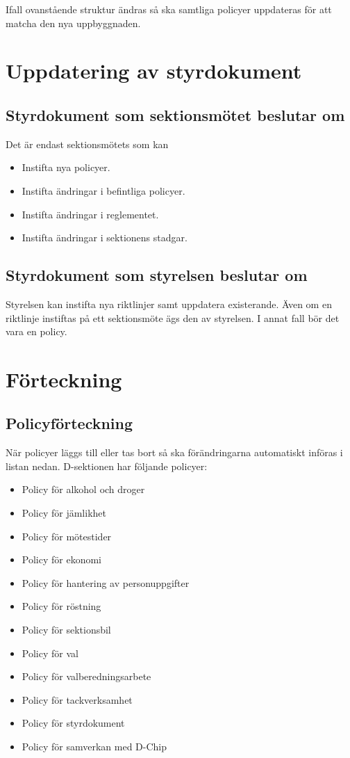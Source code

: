 \documentclass[]{dsekprotokoll}
\begin{document}
Ifall ovanstående struktur ändras så ska samtliga policyer uppdateras för att matcha den nya uppbyggnaden.

\section{Uppdatering av styrdokument}
\subsection{Styrdokument som sektionsmötet beslutar om}
Det är endast sektionsmötets som kan
\begin{itemize}
    \item Instifta nya policyer.
    \item Instifta ändringar i befintliga policyer.
    \item Instifta ändringar i reglementet.
    \item Instifta ändringar i sektionens stadgar.
\end{itemize}

\subsection{Styrdokument som styrelsen beslutar om}
Styrelsen kan instifta nya riktlinjer samt uppdatera existerande. Även om en riktlinje instiftas på ett sektionsmöte ägs den av styrelsen. I annat fall bör det vara en policy.

\section{Förteckning}
\subsection{Policyförteckning}
När policyer läggs till eller tas bort så ska förändringarna automatiskt införas i listan nedan.
D-sektionen har följande policyer:
\begin{itemize}
    \item Policy för alkohol och droger
    \item Policy för jämlikhet
    \item Policy för mötestider
    \item Policy för ekonomi
    \item Policy för hantering av personuppgifter
    \item Policy för röstning
    \item Policy för sektionsbil
    \item Policy för val
    \item Policy för valberedningsarbete
    \item Policy för tackverksamhet
    \item Policy för styrdokument
    \item Policy för samverkan med D-Chip
\end{itemize}
\end{document}
